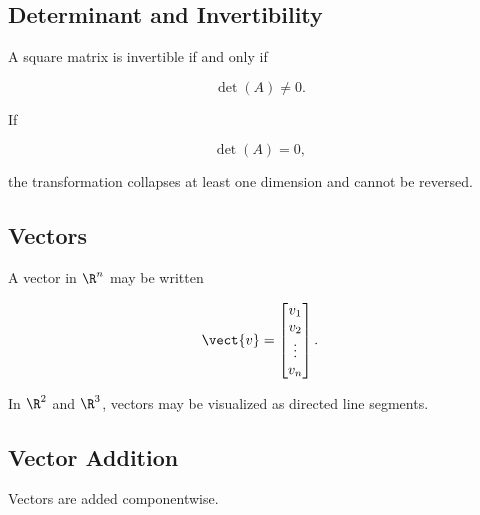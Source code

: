 \subsection{Determinant and Invertibility}
\label{subsec:determinant-invertibility}

A square matrix is invertible if and only if

\[ \det(A)\neq0. \]

If

\[ \det(A)=0, \]

the transformation collapses at least one dimension and cannot be reversed.

\subsection{Vectors}
\label{subsec:vectors}

A vector in \(\R^n\) may be written

\[ \vect{v}=\begin{bmatrix}v_1\\v_2\\\vdots\\v_n\end{bmatrix}. \]

In \(\R^2\) and \(\R^3\), vectors may be visualized as directed line segments.

\begin{center}
\end{center}

\subsection{Vector Addition}
\label{subsec:vector-addition}

Vectors are added componentwise.

